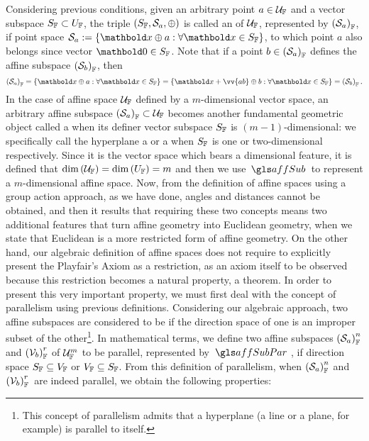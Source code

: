 Considering previous conditions, given an arbitrary point $a\in \eam{U}{F}$ and a vector subspace $S_\cam{F}\subset U_\cam{F}$, the triple $(S_\cam{F},\epu{S}_a,\oplus)$ is called an  of $\eam{U}{F}$, represented by $\eams{S}{F}{a}$, if point space $\epu{S}_a:=\{\vto{x}\oplus a:\forall \vto{x}\in S_\cam{F}\}$, to which point $a$ also belongs since vector $\vto{0}\in S_\cam{F}$. Note that if a point $b\in\eams{S}{F}{a}$ defines the affine subspace $\eams{S}{F}{b}$, then 
\begin{equation}\label{eq:igualAff}
\eams{S}{F}{a}=\{\vto{x}\oplus a:\forall \vto{x}\in S_\cam{F}\}=\{\vto{x}+\vv{ab}\oplus b:\forall \vto{x}\in S_\cam{F}\}=\eams{S}{F}{b}\,.
\end{equation}
In the case of affine space $\eam{U}{F}$ defined by a $m$-dimensional vector space, an arbitrary affine  subspace $\eams{S}{F}{a}\subset\eam{U}{F}$ becomes another fundamental geometric object called a  when its definer vector subspace $S_\cam{F}$ is $(m-1)$-dimensional: we specifically call the hyperplane a  or a  when $S_\cam{F}$ is one or two-dimensional respectively. Since it is the vector space which bears a dimensional feature, it is defined that $\dim{(\eam{U}{F})}=\dim{(U_\cam{F})}=m$ and then we use $\gloref{affSub}$ to represent a $m$-dimensional affine space. Now, from the definition of affine spaces using a group action approach, as we have done, angles and distances cannot be obtained, and then it results that requiring these two concepts means two additional features that turn affine geometry into Euclidean geometry, when we state that Euclidean is a more restricted form of affine geometry. On the other hand, our algebraic definition of affine spaces does not require to explicitly present the Playfair's Axiom as a restriction, as an axiom itself to be observed because this restriction becomes a natural property, a theorem. In order to present this very important property, we must first deal with the concept of parallelism using previous definitions. Considering our algebraic approach, two affine subspaces are considered to be  if the direction space of one is an improper subset of the other\footnote{This concept of parallelism admits that a hyperplane (a line or a plane, for example) is parallel to itself.}. In mathematical terms, we define two affine subspaces $\eamsd{S}{F}{a}{n}$ and $\eamsd{V}{F}{b}{r}$ of $\eamd{U}{F}{m}$ to be parallel, represented by $\gloref{affSubPar}\,$, if direction space $S_\cam{F}\subseteq V_\cam{F}$ or $V_\cam{F}\subseteq S_\cam{F}$. From this definition of parallelism, when $\eamsd{S}{F}{a}{n}$ and $\eamsd{V}{F}{b}{r}\,$ are indeed parallel, we obtain the following properties:
